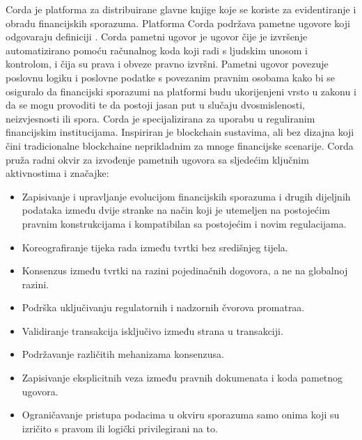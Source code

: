 \documentclass[times, utf8, diplomski]{fer}
\begin{document}
Corda je platforma za distribuirane glavne knjige koje se koriste za evidentiranje i obradu financijskih sporazuma. Platforma Corda podržava pametne ugovore koji odgovaraju definiciji \cite{Corda}. Corda pametni ugovor je ugovor čije je izvršenje automatizirano pomoću računalnog koda koji radi s ljudskim unosom i kontrolom, i čija su prava i obveze pravno izvršni. Pametni ugovor povezuje poslovnu logiku i poslovne podatke s povezanim pravnim osobama kako bi se osiguralo da financijski sporazumi na platformi budu ukorijenjeni vrsto u zakonu i da se mogu provoditi te da postoji jasan put u slučaju dvosmislenosti, neizvjesnosti ili spora.
Corda je specijalizirana za uporabu u reguliranim financijskim institucijama. Inspiriran je blockchain sustavima, ali bez dizajna koji čini tradicionalne blockchaine neprikladnim za mnoge financijske scenarije. Corda pruža radni okvir za izvođenje pametnih ugovora sa sljedećim ključnim aktivnostima i značajke:

\begin{itemize}

\item Zapisivanje i upravljanje evolucijom financijskih sporazuma i drugih dijeljnih podataka između dvije stranke na način koji je utemeljen na postojećim pravnim konstrukcijama i kompatibilan sa postojećim i novim regulacijama.

\item Koreografiranje tijeka rada između tvrtki bez središnjeg tijela.

\item Konsenzus između tvrtki na razini pojedinačnih dogovora, a ne na globalnoj razini.

\item Podrška uključivanju regulatornih i nadzornih čvorova promatraa.

\item Validiranje transakcija isključivo između strana u transakciji.

\item Podržavanje različitih mehanizama konsenzusa.

\item Zapisivanje eksplicitnih veza između pravnih dokumenata i koda pametnog ugovora.

\item Ograničavanje pristupa podacima u okviru sporazuma samo onima koji su izričito s pravom ili logički privilegirani na to.

\end{itemize}
\end{document}
